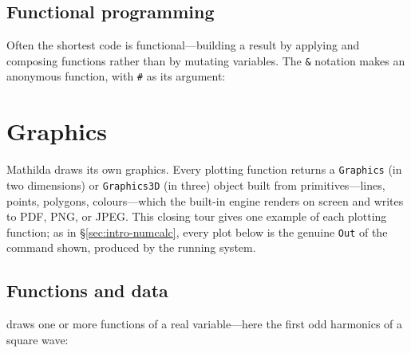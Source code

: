 \subsection*{Functional programming}

Often the shortest code is functional---building a result by applying and composing
functions rather than by mutating variables. The \texttt{\&} notation makes an
anonymous function, with \texttt{\#} as its argument:

\begin{codepairs}
\end{codepairs}

\section{Graphics}
\label{sec:intro-graphics}

Mathilda draws its own graphics. Every plotting function returns a \texttt{Graphics} (in two
dimensions) or \texttt{Graphics3D} (in three) object built from primitives---lines, points,
polygons, colours---which the built-in engine renders on screen and  writes to
PDF, PNG, or JPEG. This closing tour gives one example of each plotting function; as in
\S\ref{sec:intro-numcalc}, every plot below is the genuine \texttt{Out} of the command
shown, produced by the running system.

\subsection{Functions and data}

 draws one or more functions of a real variable---here the first odd harmonics of
a square wave:

